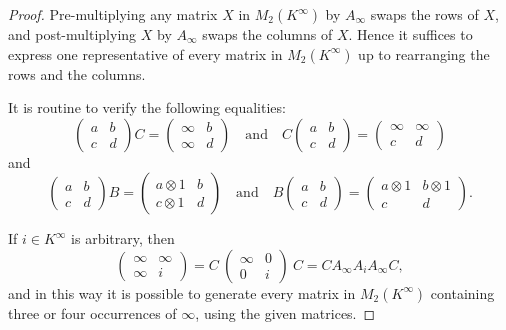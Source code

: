 \documentclass{amsart}
\numberwithin{equation}{section}
\theoremstyle{definition}
\begin{document}
\begin{proof}
  Pre-multiplying any matrix $X$ in $M_2(K^{\infty})$ by $A_{\infty}$ swaps the
  rows of $X$, and post-multiplying $X$ by $A_{\infty}$ swaps the columns of
  $X$.  Hence it suffices to express one representative of every matrix in 
  $M_2(K^{\infty})$ up to rearranging the rows and the columns. 

  It is routine to verify the following equalities:
  \begin{equation*}\label{eq-annihilate}
    \begin{pmatrix}
      a & b \\
      c & d
    \end{pmatrix}
    C 
    = 
    \begin{pmatrix}
      \infty & b \\
      \infty & d
    \end{pmatrix}
    \quad
    \text{and}
    \quad
    C 
    \begin{pmatrix}
      a & b \\
      c & d
    \end{pmatrix}
    = 
    \begin{pmatrix}
      \infty & \infty \\
      c      & d
    \end{pmatrix}
  \end{equation*}
  and 
  \begin{equation*}\label{eq-add-1}
    \begin{pmatrix}
      a & b \\
      c & d
    \end{pmatrix}
    B 
    = 
    \begin{pmatrix}
      a \otimes 1 & b \\
      c \otimes 1 & d
    \end{pmatrix}
    \quad
    \text{and}
    \quad
    B 
    \begin{pmatrix}
      a & b \\
      c & d
    \end{pmatrix}
    = 
    \begin{pmatrix}
      a \otimes 1 & b \otimes 1\\
      c     & d
    \end{pmatrix}.
  \end{equation*}

  If $i\in K^{\infty}$ is arbitrary, then 
  \begin{equation*}
    \begin{pmatrix}
      \infty & \infty \\
      \infty & i
    \end{pmatrix}
    = 
    C\ 
    \begin{pmatrix}
      \infty & 0 \\
      0      & i
    \end{pmatrix}\ 
    C
    = 
    C A_{\infty} A_i A_{\infty} C,
  \end{equation*}
  and in this way it is possible to generate every matrix in $M_2(K^{\infty})$
  containing three or four occurrences of $\infty$, using the given matrices.


\end{proof}
\end{document}
